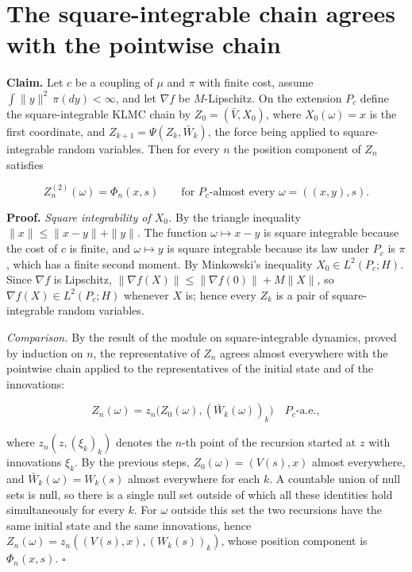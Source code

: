 \documentclass[11pt,a4paper]{article}
\begin{document}
\section{\texorpdfstring{The square-integrable chain agrees with the pointwise chain}{The square-integrable chain agrees with the pointwise chain}}


\textbf{Claim.} Let \(c\) be a coupling of \(\mu\) and \(\pi\) with finite cost, assume \(\int\|y\|^2\,\pi(dy)<\infty\), and let \(\nabla f\) be \(M\)-Lipschitz. On the extension \(P_c\) define the square-integrable KLMC chain by \(Z_0=(\bar V,X_0)\), where \(X_0(\omega)=x\) is the first coordinate, and \(Z_{k+1}=\Psi(Z_k,\bar W_k)\), the force being applied to square-integrable random variables. Then for every \(n\) the position component of \(Z_n\) satisfies


\[Z_n^{(2)}(\omega)=\Phi_n(x,s)\qquad\text{for }P_c\text{-almost every }\omega=((x,y),s).\]


\textbf{Proof.} \emph{Square integrability of \(X_0\).} By the triangle inequality \(\|x\|\le\|x-y\|+\|y\|\). The function \(\omega\mapsto x-y\) is square integrable because the cost of \(c\) is finite, and \(\omega\mapsto y\) is square integrable because its law under \(P_c\) is \(\pi\), which has a finite second moment. By Minkowski's inequality \(X_0\in L^2(P_c;H)\). Since \(\nabla f\) is Lipschitz, \(\|\nabla f(X)\|\le\|\nabla f(0)\|+M\|X\|\), so \(\nabla f(X)\in L^2(P_c;H)\) whenever \(X\) is; hence every \(Z_k\) is a pair of square-integrable random variables.




\emph{Comparison.} By the result of the module on square-integrable dynamics, proved by induction on \(n\), the representative of \(Z_n\) agrees almost everywhere with the pointwise chain applied to the representatives of the initial state and of the innovations:


\[Z_n(\omega)=z_n\bigl(Z_0(\omega),(\bar W_k(\omega))_{k}\bigr)\quad P_c\text{-a.e.},\]


where \(z_n(z,(\xi_k)_k)\) denotes the \(n\)-th point of the recursion started at \(z\) with innovations \(\xi_k\). By the previous steps, \(Z_0(\omega)=(V(s),x)\) almost everywhere, and \(\bar W_k(\omega)=W_k(s)\) almost everywhere for each \(k\). A countable union of null sets is null, so there is a single null set outside of which all these identities hold simultaneously for every \(k\). For \(\omega\) outside this set the two recursions have the same initial state and the same innovations, hence \(Z_n(\omega)=z_n((V(s),x),(W_k(s))_k)\), whose position component is \(\Phi_n(x,s)\). \(\square\)
\end{document}
